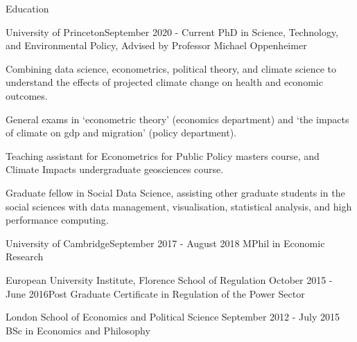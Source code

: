 \documentclass{resume} %
\begin{document}
\begin{rSection}{Education}

\begin{rSubsection}{University of Princeton}{September 2020 - Current} {PhD in Science, Technology, and Environmental Policy, Advised by Professor Michael Oppenheimer}{}
\item Combining data science, econometrics, political theory, and climate science to understand the effects of projected climate change on health and economic outcomes.
\item General exams in `econometric theory' (economics department) and `the impacts of climate on gdp and migration' (policy department). 
\item Teaching assistant for Econometrics for Public Policy masters course, and Climate Impacts undergraduate geosciences course. 
\item Graduate fellow in Social Data Science, assisting other graduate students in the social sciences with data management, visualisation, statistical analysis, and high performance computing. 
\end{rSubsection}


\begin{rSubsection}{University of Cambridge}{September 2017 - August 2018} {MPhil in Economic Research}{}
\end{rSubsection}
\begin{rSubsection}{European University Institute, Florence School of Regulation} {October 2015 - June 2016}{Post Graduate Certificate in Regulation of the Power Sector}{ }
\end{rSubsection}
\begin{rSubsection}{London School of Economics and Political Science} {September 2012 - July 2015} {BSc in Economics and Philosophy} { }
\end{rSubsection}


\end{rSection}
\end{document}
